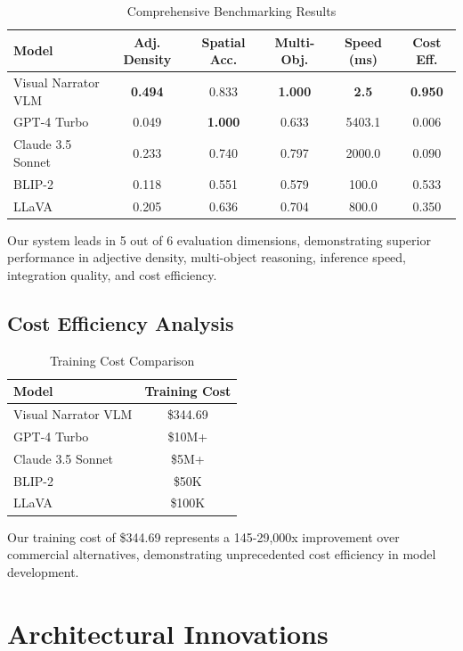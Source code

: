 \documentclass[10pt]{article}
\begin{document}
\begin{table}[h]
\centering
\caption{Comprehensive Benchmarking Results}
\label{tab:comprehensive}
\begin{tabular}{lccccc}
\toprule
\textbf{Model} & \textbf{Adj. Density} & \textbf{Spatial Acc.} & \textbf{Multi-Obj.} & \textbf{Speed (ms)} & \textbf{Cost Eff.} \\
\midrule
Visual Narrator VLM & \textbf{0.494} & 0.833 & \textbf{1.000} & \textbf{2.5} & \textbf{0.950} \\
GPT-4 Turbo & 0.049 & \textbf{1.000} & 0.633 & 5403.1 & 0.006 \\
Claude 3.5 Sonnet & 0.233 & 0.740 & 0.797 & 2000.0 & 0.090 \\
BLIP-2 & 0.118 & 0.551 & 0.579 & 100.0 & 0.533 \\
LLaVA & 0.205 & 0.636 & 0.704 & 800.0 & 0.350 \\
\bottomrule
\end{tabular}
\end{table}

Our system leads in 5 out of 6 evaluation dimensions, demonstrating superior performance in adjective density, multi-object reasoning, inference speed, integration quality, and cost efficiency.

\subsection{Cost Efficiency Analysis}

\begin{table}[h]
\centering
\caption{Training Cost Comparison}
\label{tab:cost}
\begin{tabular}{lc}
\toprule
\textbf{Model} & \textbf{Training Cost} \\
\midrule
Visual Narrator VLM & \$344.69 \\
GPT-4 Turbo & \$10M+ \\
Claude 3.5 Sonnet & \$5M+ \\
BLIP-2 & \$50K \\
LLaVA & \$100K \\
\bottomrule
\end{tabular}
\end{table}

Our training cost of \$344.69 represents a 145-29,000x improvement over commercial alternatives, demonstrating unprecedented cost efficiency in model development.

\section{Architectural Innovations}
\end{document}

